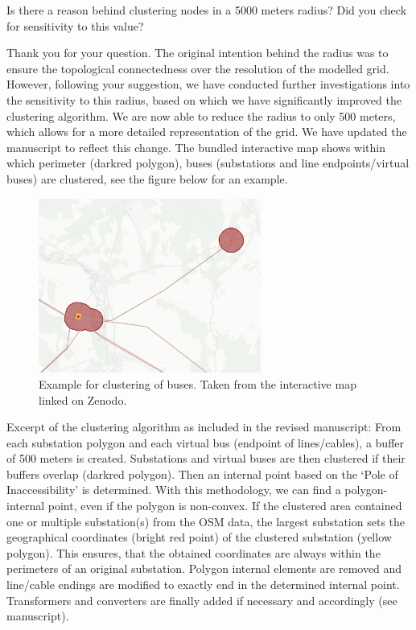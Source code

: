 \documentclass{response}
\begin{document}
\RC Is there a reason behind clustering nodes in a 5000 meters radius? Did you check for sensitivity to this value? 

\AR Thank you for your question. The original intention behind the radius was to ensure the topological connectedness over the resolution of the modelled grid. However, following your suggestion, we have conducted further investigations into the sensitivity to this radius, based on which we have significantly improved the clustering algorithm. We are now able to reduce the radius to only 500 meters, which allows for a more detailed representation of the grid. We have updated the manuscript to reflect this change. The bundled interactive map shows within which perimeter (darkred polygon), buses (substations and line endpoints/virtual buses) are clustered, see the figure below for an example.

\begin{figure}[h]
    \centering
    \includegraphics[width=0.65\textwidth]{figures/fig_example_clustering.png}
    \caption{Example for clustering of buses. Taken from the interactive map linked on Zenodo. \cite{xiongPrebuiltElectricityNetwork2024}}
    \label{fig:example_clustering}
\end{figure}

Excerpt of the clustering algorithm as included in the revised manuscript: From each substation polygon and each virtual bus (endpoint of lines/cables), a buffer of 500 meters is created. Substations and virtual buses are then clustered if their buffers overlap (darkred polygon). Then an internal point based on the `Pole of Inaccessibility' \cite{garcia-castellanosPolesInaccessibilityCalculation2007} is determined. With this methodology, we can find a polygon-internal point, even if the polygon is non-convex. If the clustered area contained one or multiple substation(s) from the OSM data, the largest substation sets the geographical coordinates (bright red point) of the clustered substation (yellow polygon). This ensures, that the obtained coordinates are always within the perimeters of an original substation. Polygon internal elements are removed and line/cable endings are modified to exactly end in the determined internal point. Transformers and converters are finally added if necessary and accordingly (see manuscript).
\end{document}
